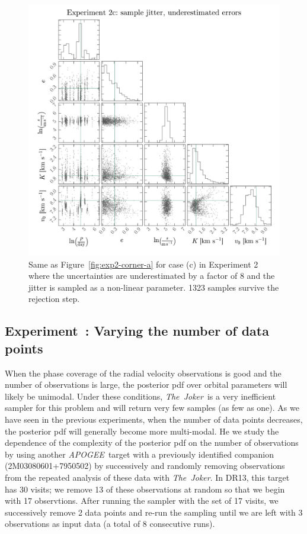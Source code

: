 \documentclass[manuscript, letterpaper]{aastex6}
\newcommand{\project}[1]{\textsl{#1}}
\newcommand{\acronym}[1]{{\small{#1}}}
\newcommand{\apogee}{\project{\acronym{APOGEE}}}
\newcommand{\samplername}{\project{The~Joker}}
\newcommand{\figname}{Figure}
\newcounter{expcounter}
\begin{document}
\begin{figure}[p]
\begin{center}
\includegraphics[width=\textwidth]{figures/exp2-corner-c.pdf}
\end{center}
\caption{%
Same as \figname~\ref{fig:exp2-corner-a} for case (c) in Experiment 2 where the
uncertainties are underestimated by a factor of 8 and the jitter is sampled as
a non-linear parameter.
1323 samples survive the rejection step.
\label{fig:exp2-corner-c}}
\end{figure}

\subsection{Experiment~: Varying the number of data points}

When the phase coverage of the radial velocity observations is good and the
number of observations is large, the posterior pdf over orbital parameters will
likely be unimodal.
Under these conditions, \samplername\ is a very inefficient sampler for this
problem and will return very few samples (as few as one).
As we have seen in the previous experiments, when the number of data points
decreases, the posterior pdf will generally become more multi-modal.
He we study the dependence of the complexity of the posterior pdf on the number
of observations by using another \apogee\ target with a previously identified
companion (2M03080601+7950502) by successively and randomly removing
observations from the repeated analysis of these data with \samplername.
In DR13, this target has 30 visits; we remove 13 of these observations at random
so that we begin with 17 observtions.
After running the sampler with the set of 17 visits, we successively remove 2
data points and re-run the sampling until we are left with 3 observations as
input data (a total of 8 consecutive runs).
\end{document}
